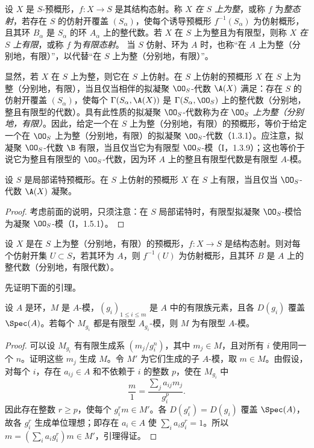 设 $X$ 是 $S$-预概形，$f:X\to S$ 是其结构态射。称 $X$ \emph{在 $S$ 上为整}，或称 $f$ 为\emph{整态射}，若存在 $S$ 的仿射开覆盖 $(S_\alpha)$，使每个诱导预概形 $f^{-1}(S_\alpha)$ 为仿射概形，且其环 $B_\alpha$ 是 $S_\alpha$ 的环 $A_\alpha$ 上的整代数。若 $X$ 在 $S$ 上为整且为有限型，则称 $X$ \emph{在 $S$ 上有限}，或称 $f$ 为\emph{有限态射}。
当 $S$ 仿射、环为 $A$ 时，也称“在 $A$ 上为整（分别地，有限）”，以代替“在 $S$ 上为整（分别地，有限）”。

显然，若 $X$ 在 $S$ 上为整，则它在 $S$ 上仿射。在 $S$ 上仿射的预概形 $X$ 在 $S$ 上为整（分别地，有限），当且仅当相伴的拟凝聚 $\OO_S$-代数 $\A(X)$ 满足：存在 $S$ 的仿射开覆盖 $(S_\alpha)$，使每个
$\Gamma(S_\alpha,\A(X))$ 是 $\Gamma(S_\alpha,\OO_S)$ 上的整代数（分别地，整且有限型的代数）。具有此性质的拟凝聚 $\OO_S$-代数称为\emph{在 $\OO_S$ 上为整（分别地，有限）}。因此，给定一个在 $S$ 上为整（分别地，有限）的预概形，等价于给定一个在 $\OO_S$ 上为整（分别地，有限）的拟凝聚 $\OO_S$-代数（1.3.1）。应注意，拟凝聚 $\OO_S$-代数 $\B$ 有限，当且仅当它为有限型 $\OO_S$-模（I，1.3.9）；这也等价于说它为整且有限型的 $\OO_S$-代数，因为环 $A$ 上的整且有限型代数是有限型 $A$-模。

设 $S$ 是局部诺特预概形。在 $S$ 上仿射的预概形 $X$ 在 $S$ 上有限，当且仅当 $\OO_S$-代数 $\A(X)$ 凝聚。
\begin{proof}
考虑前面的说明，只须注意：在 $S$ 局部诺特时，有限型拟凝聚 $\OO_S$-模恰为凝聚 $\OO_S$-模（I，1.5.1）。
\end{proof}

设 $X$ 是在 $S$ 上为整（分别地，有限）的预概形，$f:X\to S$ 是结构态射。则对每个仿射开集 $U\subset S$，若其环为 $A$，则 $f^{-1}(U)$ 为仿射概形，且其环 $B$ 是 $A$ 上的整代数（分别地，有限代数）。

先证明下面的引理。

设 $A$ 是环，$M$ 是 $A$-模，$(g_i)_{1\leq i\leq m}$ 是 $A$ 中的有限族元素，且各 $D(g_i)$ 覆盖 $\Spec(A)$。若每个 $M_{g_i}$ 都是有限型 $A_{g_i}$-模，则 $M$ 为有限型 $A$-模。
\begin{proof}
可以设 $M_{g_i}$ 有有限生成系 $(m_j/g_i^n)$，其中 $m_j\in M$，且对所有 $i$ 使用同一个 $n$。证明这些 $m_j$ 生成 $M$。令 $M'$ 为它们生成的子 $A$-模，取 $m\in M$。由假设，对每个 $i$，存在 $a_{ij}\in A$ 和不依赖于 $i$ 的整数 $p$，使在 $M_{g_i}$ 中
\[
\frac m1=\frac{\sum_j a_{ij}m_j}{g_i^p}.
\]
因此存在整数 $r\geq p$，使每个 $g_i^r m\in M'$。各 $D(g_i^r)=D(g_i)$ 覆盖 $\Spec(A)$，故各 $g_i^r$ 生成单位理想；即存在 $a_i\in A$ 使 $\sum_i a_i g_i^r=1$。所以
$m=(\sum_i a_i g_i^r)m\in M'$，引理得证。
\end{proof}


